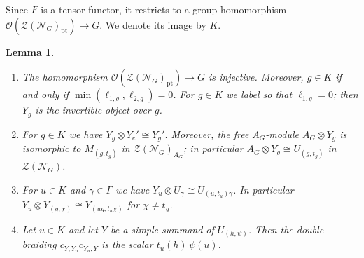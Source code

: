 \documentclass[10pt]{article}
\theoremstyle{plain}
\newtheorem{lemma}[theorem]{Lemma}
\theoremstyle{definition}
\theoremstyle{plain}
\begin{document}
\par Since $F$ is a tensor functor, it restricts to a group homomorphism $\mathcal{O}(\mathcal{Z}(\mathcal{N}_G)_\mathrm{pt})\to G$. We denote its image by $K$.

\begin{lemma}\label{lem:liftable}
\leavevmode
\begin{enumerate}
\item The homomorphism $\mathcal{O}(\mathcal{Z}(\mathcal{N}_G)_\mathrm{pt})\to G$ is injective. Moreover, $g\in K$ if and only if $\min(\ell_{1,g},\ell_{2,g})=0$. For $g\in K$ we label so that $\ell_{1,g}=0$; then $Y_g$ is the invertible object over $g$.
\item For $g\in K$ we have $Y_g\otimes Y_e'\cong Y_g'$. Moreover, the free $A_G$-module $A_G\otimes Y_g$ is isomorphic to $M_{(g,t_g)}$ in $\mathcal{Z}(\mathcal{N}_G)_{A_G}$; in particular $A_G\otimes Y_g\cong U_{(g,t_g)}$ in $\mathcal{Z}(\mathcal{N}_G)$.
\item For $u\in K$ and $\gamma\in\Gamma$ we have $Y_u\otimes U_\gamma\cong U_{(u,t_u)\gamma}$. In particular $Y_u\otimes Y_{(g,\chi)}\cong Y_{(ug,t_u\chi)}$ for $\chi\neq t_g$.
\item Let $u\in K$ and let $Y$ be a simple summand of $U_{(h,\psi)}$. Then the double braiding $c_{Y,Y_u}c_{Y_u,Y}$ is the scalar $t_u(h)\,\psi(u)$.
\end{enumerate}
\end{lemma}
\end{document}
